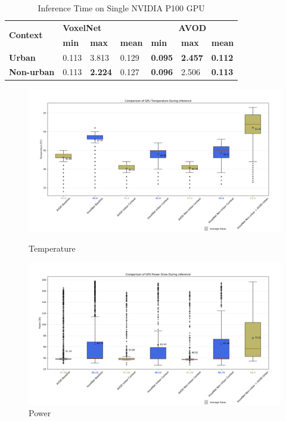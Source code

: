 \begin{table}[H]%
	\centering
	\begin{tabular}{|l|l|l|l|l|l|l|}
		\hline
		\multirow{2}{*}{\textbf{Context}} & \multicolumn{3}{l|}{\textbf{VoxelNet}} & \multicolumn{3}{c|}{\textbf{AVOD}} \\ \cline{2-7} 
		& \textbf{min} & \textbf{max} & \textbf{mean} & \textbf{min} & \textbf{max} & \textbf{mean} \\ \hline
		\textbf{Urban} & 0.113 & 3.813 & 0.129 & \textbf{0.095} & \textbf{2.457} & \textbf{0.112} \\ \hline
		\textbf{Non-urban} & 0.113 & \textbf{2.224} & 0.127 & \textbf{0.096} & 2.506 & \textbf{0.113} \\ \hline
	\end{tabular}%
	\caption{Inference Time on Single NVIDIA P100 GPU}
	\label{tab:inftime}
\end{table}
\begin{figure}[H] %
	\centering
	\begin{minipage}[b]{0.45\textwidth}
		\includegraphics[width=\textwidth]{images/gputepbox.png}
		\caption{Temperature }
		\label{fig:temp}
	\end{minipage}
	\begin{minipage}[b]{0.49\textwidth}
		\includegraphics[width=\textwidth]{images/gpupbox.png}
		\caption{Power}
		\label{fig:power}
	\end{minipage}
	
\end{figure}


